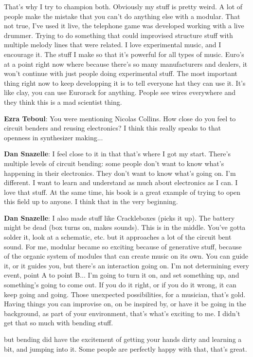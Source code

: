 That's why I try to champion both. Obviously my stuff is pretty weird. A lot of people make the mistake that you can't do anything else with a modular. That not true, I've used it live, the telephone game was developed working with a live drummer. Trying to do something that could improvised structure stuff with multiple melody lines that were related. I love experimental music, and I encourage it. The stuff I make so that it's powerful for all types of music. Euro's at a point right now where because there's so many manufacturers and dealers, it won't continue with just people doing experimental stuff. The most important thing right now to keep developping it is to tell everyone hat they can use it. It's like clay, you can use Eurorack for anything. People see wires everywhere and they think this is a mad scientist thing.

\textbf{Ezra Teboul}: You were mentioning Nicolas Collins. How close do you feel to circuit benders and reusing electronics? I think this really speaks to that openness in synthesizer making...

\textbf{Dan Snazelle}: I feel close to it in that that's where I got my start. There's multiple levels of circuit bending: some people don't want to know what's happening in their electronics. They don't want to know what's going on. I'm different. I want to learn and understand as much about electronics as I can. I love that stuff. At the same time, his book is a great example of trying to open this field up to anyone. I think that in the very beginning.  

\textbf{Dan Snazelle}: I also made stuff like Crackleboxes (picks it up). The battery might be dead (box turns on, makes sounds). This is in the middle. You've gotta solder it, look at a schematic, etc. but it approaches a lot of the circuit bent sound. For me, modular became so exciting because of generative stuff, because of the organic system of modules that can create music on its own. You can guide it, or it guides you, but there's an interaction going on. I'm not determining every event, point A to point B... I'm going to turn it on, and set something up, and something's going to come out. If you do it right, or if you do it wrong, it can keep going and going. Those unexpected possibilities, for a musician, that's gold. Having things you can improvise on, on be inspired by, or have it be going in the background, as part of your environment, that's what's exciting to me. I didn't get that so much with bending stuff. 

but bending did have the excitement of getting your hands dirty and learning a bit, and jumping into it. Some people are perfectly happy with that, that's great. 

